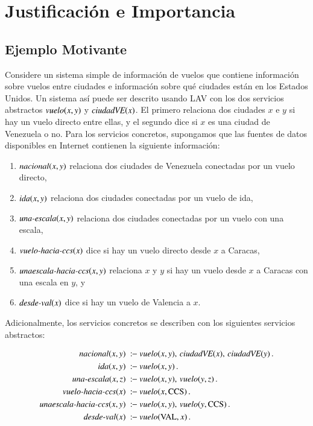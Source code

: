 \section{Justificación e Importancia}

\subsection{Ejemplo Motivante}

\newcommand{\vuelo}{\text{\it vuelo}}
\newcommand{\ciudadVE}{\text{\it ciudadVE}}
\newcommand{\nacional}{\text{\it nacional}}
\newcommand{\ida}{\text{\it ida}}
\newcommand{\unaescala}{\text{\it una-escala}}
\newcommand{\vueloCCS}{\text{\it vuelo-hacia-ccs}}
\newcommand{\unaparadaCCS}{\text{\it unaescala-hacia-ccs}}
\newcommand{\desdeVAL}{\text{\it desde-val}}
\newcommand{\PA}{\text{CCS}}
\newcommand{\NY}{\text{VAL}}
\newcommand{\AL}{\text{AL}}

Considere un sistema simple de información de vuelos que contiene información
sobre vuelos entre ciudades e información sobre qué ciudades están en los
Estados Unidos. Un sistema así puede ser descrito usando LAV con los dos servicios
abstractos $\vuelo(x,y)$ y $\ciudadVE(x)$. El primero relaciona dos ciudades $x$ e $y$ si
hay un vuelo directo entre ellas, y el segundo dice si $x$ es una ciudad de
Venezuela  o no. Para los servicios concretos, supongamos que las fuentes de
datos disponibles en Internet contienen la siguiente información:

\begin{enumerate}[--]
\item $\nacional(x,y)$ relaciona dos ciudades de Venezuela conectadas por un vuelo directo,
\item $\ida(x,y)$ relaciona dos ciudades conectadas por un vuelo de ida,
\item $\unaescala(x,y)$ relaciona dos ciudades conectadas por un vuelo con una escala,
\item $\vueloCCS(x)$ dice si hay un vuelo directo desde $x$ a Caracas,
\item $\unaparadaCCS(x,y)$ relaciona $x$ y $y$ si hay un vuelo desde $x$ a Caracas con una escala en $y$, y
\item $\desdeVAL(x)$ dice si hay un vuelo de Valencia a $x$.
\end{enumerate}

Adicionalmente, los servicios concretos se describen con los siguientes
servicios abstractos:

\begin{alignat*}{1}
\nacional(x,y)\   &\qrule\ \vuelo(x,y),\,\ciudadVE(x),\,\ciudadVE(y)\,. \\
\ida(x,y)\     &\qrule\ \vuelo(x,y)\,. \\
\unaescala(x,z)\    &\qrule\ \vuelo(x,y),\,\vuelo(y,z)\,. \\
\vueloCCS(x)\     &\qrule\ \vuelo(x,\PA)\,. \\
\unaparadaCCS(x,y)\  &\qrule\ \vuelo(x,y),\,\vuelo(y,\PA)\,. \\
\desdeVAL(x)\       &\qrule\ \vuelo(\NY,x)\,.
\end{alignat*}

